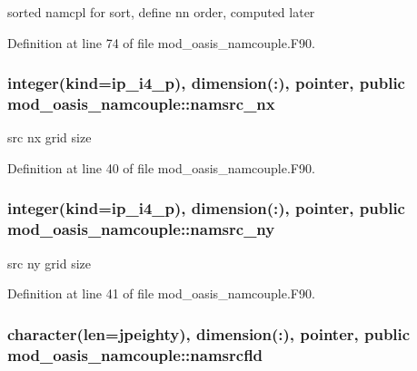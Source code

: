 sorted namcpl for sort, define nn order, computed later 



Definition at line 74 of file mod\+\_\+oasis\+\_\+namcouple.\+F90.

\hypertarget{classmod__oasis__namcouple_ac8f6c8fe3720739f3d26431a8a600506}{
\subsubsection[{namsrc\+\_\+nx}]{\setlength{\rightskip}{0pt plus 5cm}integer(kind=ip\+\_\+i4\+\_\+p), dimension(\+:), pointer, public mod\+\_\+oasis\+\_\+namcouple\+::namsrc\+\_\+nx}}\label{classmod__oasis__namcouple_ac8f6c8fe3720739f3d26431a8a600506}


src nx grid size 



Definition at line 40 of file mod\+\_\+oasis\+\_\+namcouple.\+F90.

\hypertarget{classmod__oasis__namcouple_ab82c80f007b37865172ddb033a1abb36}{
\subsubsection[{namsrc\+\_\+ny}]{\setlength{\rightskip}{0pt plus 5cm}integer(kind=ip\+\_\+i4\+\_\+p), dimension(\+:), pointer, public mod\+\_\+oasis\+\_\+namcouple\+::namsrc\+\_\+ny}}\label{classmod__oasis__namcouple_ab82c80f007b37865172ddb033a1abb36}


src ny grid size 



Definition at line 41 of file mod\+\_\+oasis\+\_\+namcouple.\+F90.

\hypertarget{classmod__oasis__namcouple_a5fcb5a4f2a49f414fafe38b03c5c089d}{
\subsubsection[{namsrcfld}]{\setlength{\rightskip}{0pt plus 5cm}character(len={\bf jpeighty}), dimension(\+:), pointer, public mod\+\_\+oasis\+\_\+namcouple\+::namsrcfld}}\label{classmod__oasis__namcouple_a5fcb5a4f2a49f414fafe38b03c5c089d}


